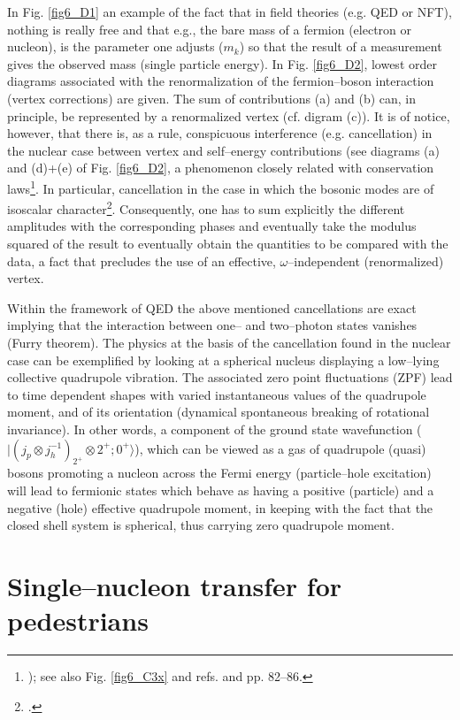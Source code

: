 \begin{subappendices}
In Fig. \ref{fig6_D1} an example of the fact that in field theories (e.g. QED or NFT), nothing is really free and that e.g., the bare mass of a fermion (electron or nucleon), is the parameter one adjusts ($m_k$) so that the result of a measurement  gives the observed mass (single particle energy). In Fig. \ref{fig6_D2}, lowest order diagrams associated with the renormalization of the fermion--boson interaction (vertex corrections) are given. The sum of contributions (a) and (b) can, in principle, be represented by a renormalized vertex (cf. digram (c)). It is of notice, however, that there is, as a rule, conspicuous interference (e.g. cancellation) in the nuclear case between vertex and self--energy contributions (see diagrams (a) and (d)+(e) of Fig. \ref{fig6_D2}, a phenomenon closely related with conservation laws\footnote{ \cite{Schrieffer:64}); see also Fig. \ref{fig6_C3x} and refs. \cite{Bortignon:81,Bertsch:83} and \cite{Bortignon:98} pp. 82--86.}. In particular, cancellation in the case in which the bosonic modes are of isoscalar character\footnote{\cite{Bortignon:83}.}. Consequently, one has to sum explicitly the different amplitudes with the corresponding phases and eventually take the modulus squared of the result to eventually obtain the quantities to be compared with the data, a fact that precludes the use of an effective, $\omega$--independent (renormalized) vertex.

Within the framework of QED the above mentioned cancellations are exact implying that the interaction between one-- and two--photon states vanishes (Furry theorem). The physics at the basis of the cancellation found in the nuclear case can be exemplified by looking at a spherical nucleus displaying a low--lying collective quadrupole vibration. The associated zero point fluctuations (ZPF) lead to time dependent shapes with varied instantaneous values of the quadrupole moment,  and of its orientation (dynamical spontaneous breaking of rotational invariance). In other words, a component of the ground state wavefunction ($|(j_p \otimes j_h^{-1})_{2^+} \otimes 2^+; 0^+\rangle $), which can be viewed as a  gas of quadrupole (quasi) bosons promoting a nucleon across the Fermi energy (particle--hole excitation) will lead to fermionic states which behave as having a positive (particle) and a negative (hole) effective quadrupole moment, in keeping with the fact that the closed shell system is spherical, thus carrying zero quadrupole moment. 

\section{Single--nucleon transfer for pedestrians}\label{C6AppE}


\end{subappendices}
